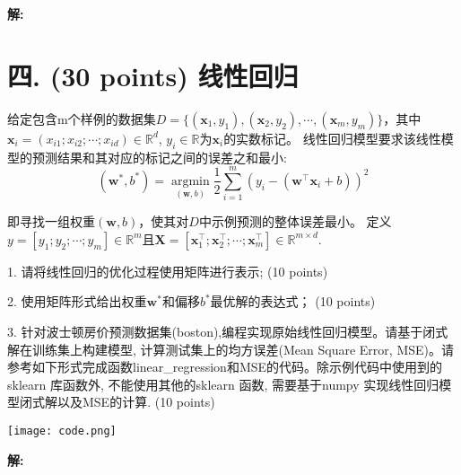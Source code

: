 \documentclass[8pt]{article}
\begin{document}
\textbf{\large 解:}


\section*{四. (30 points) 线性回归}
给定包含m个样例的数据集$D = \{(\textbf{x}_1,y_1), (\textbf{x}_2,y_2),\cdots, (\textbf{x}_m,y_m)\}$，其中$\textbf{x}_i = (x_{i1}; x_{i2}; \cdots; x_{id}) \in \mathbb{R}^d$, $y_i \in \mathbb{R}$为$\textbf{x}_i$的实数标记。
线性回归模型要求该线性模型的预测结果和其对应的标记之间的误差之和最小:
\begin{equation}
    (\textbf{w}^*, b^*) = \mathop{\text{argmin}}\limits_{(\textbf{w},b)} \frac{1}{2} \sum_{i=1}^m(y_i - (\textbf{w}^\top \textbf{x}_i+b))^2
\end{equation}

即寻找一组权重$(\textbf{w}, b)$，使其对$D$中示例预测的整体误差最小。
定义$y=[y_1; y_2; \cdots; y_m] \in \mathbb{R}^m$且$\textbf{X}=[\textbf{x}_1^\top;\textbf{x}_2^\top;\cdots; \textbf{x}_m^\top] \in \mathbb{R}^{m \times d}$.

1. 请将线性回归的优化过程使用矩阵进行表示; (10 points)

2. 使用矩阵形式给出权重$\textbf{w}^*$和偏移$b^*$最优解的表达式； (10 points)

3. 针对波士顿房价预测数据集(boston),编程实现原始线性回归模型。请基于闭式解在训练集上构建模型, 计算测试集上的均方误差(Mean Square Error, MSE)。请参考如下形式完成函数linear\_regression和MSE的代码。除示例代码中使用到的sklearn 库函数外, 不能使用其他的sklearn 函数, 需要基于numpy 实现线性回归模型闭式解以及MSE的计算. (10 points)


\begin{figure*}[h]
\centering
\texttt{[image: code.png]}
\end{figure*}

\textbf{\large 解:}
\end{document}
